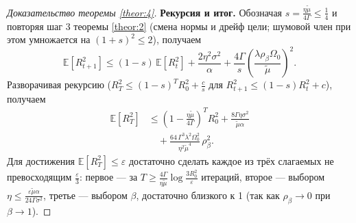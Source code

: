 \begin{proof}[Доказательство теоремы \ref{theor:4}]
\textbf{Рекурсия и итог.} Обозначая $s = \frac{\eta\widetilde{\mu}}{4\Gamma} \le \frac14$ и повторяя шаг 3 теоремы \ref{theor:2} (смена нормы и дрейф цели; шумовой член при этом умножается на $(1+s)^2 \le 2$), получаем
\begin{equation*}
    \mathbb{E}\left[R_{t+1}^2\right] \le (1-s)\,\mathbb{E}\left[R_t^2\right] + \frac{2\eta^2\sigma^2}{\alpha} + \frac{4\Gamma}{s}\left(\frac{\lambda\rho_\beta\Omega_0}{\widetilde{\mu}}\right)^2.
\end{equation*}
Разворачивая рекурсию ($R_T^2 \le (1-s)^TR_0^2 + \frac{c}{s}$ для $R_{t+1}^2 \le (1-s)R_t^2 + c$), получаем
\begin{equation*}
\begin{split}
    \mathbb{E}\left[R_T^2\right] &\le \left(1 - \frac{\eta\widetilde{\mu}}{4\Gamma}\right)^T R_0^2 + \frac{8\Gamma\eta\sigma^2}{\widetilde{\mu}\alpha} \\
    &\quad + \frac{64\,\Gamma^3\lambda^2\Omega_0^2}{\eta^2\widetilde{\mu}^4}\,\rho_\beta^2.
\end{split}
\end{equation*}
Для достижения $\mathbb{E}[R_T^2] \le \varepsilon$ достаточно сделать каждое из трёх слагаемых не превосходящим $\frac{\varepsilon}{3}$: первое --- за $T \ge \frac{4\Gamma}{\eta\widetilde{\mu}}\log\frac{3R_0^2}{\varepsilon}$ итераций, второе --- выбором $\eta \le \frac{\varepsilon\widetilde{\mu}\alpha}{24\Gamma\sigma^2}$, третье --- выбором $\beta$, достаточно близкого к 1 (так как $\rho_\beta \to 0$ при $\beta \to 1$).
\end{proof}
